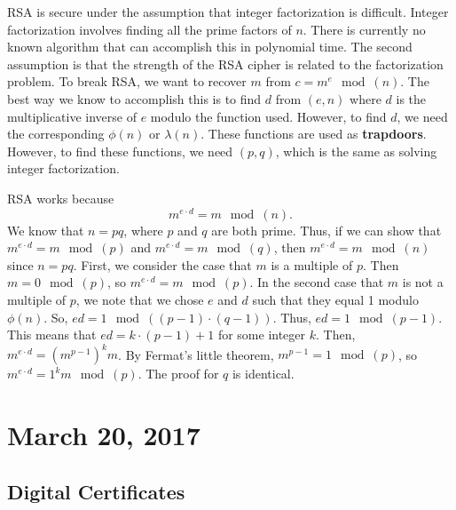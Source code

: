 \documentclass[11pt]{article}
\theoremstyle{plain} %
\theoremstyle{definition}
\theoremstyle{example}
\theoremstyle{remark}
\begin{document}
RSA is secure under the assumption that integer factorization is difficult. Integer factorization involves finding all the prime factors of $n$. There is currently no known algorithm that can accomplish this in polynomial time. The second assumption is that the strength of the RSA cipher is related to the factorization problem. To break RSA, we want to recover $m$ from $c=m^e\mod(n)$. The best way we know to accomplish this is to find $d$ from $(e,n)$ where $d$ is the multiplicative inverse of $e$ modulo the function used. However, to find $d$, we need the corresponding $\phi(n)$ or $\lambda(n)$. These functions are used as \textbf{trapdoors}. However, to find these functions, we need $(p,q)$, which is the same as solving integer factorization. 

RSA works because $$m^{e\cdot d} = m\mod(n).$$
We know that $n = p q$, where $p$ and $q$ are both prime. Thus, if we can show that $m^{e\cdot d} = m\mod(p)$ and $m^{e\cdot d} = m\mod(q)$, then $m^{e\cdot d} = m\mod(n)$ since $n = pq$. First, we consider the case that $m$ is a multiple of $p$. Then $m = 0\mod(p)$, so $m^{e\cdot d} = m \mod(p)$. 
In the second case that $m$ is not a multiple of $p$, we note that we chose $e$ and $d$ such that they equal 1 modulo $\phi(n)$. So, $ed = 1\mod((p-1)\cdot(q-1))$. Thus, $ed = 1\mod(p-1)$. This means that $ed = k\cdot(p-1)+1$ for some integer $k$. Then, $m^{e \cdot d} = \left(m^{p-1}\right)^km$. By Fermat's little theorem, $m^{p-1} = 1\mod(p)$, so $m^{e\cdot d} = 1^km\mod(p)$. The proof for $q$ is identical. 

\section{March 20, 2017}
\subsection{Digital Certificates}
\end{document}
